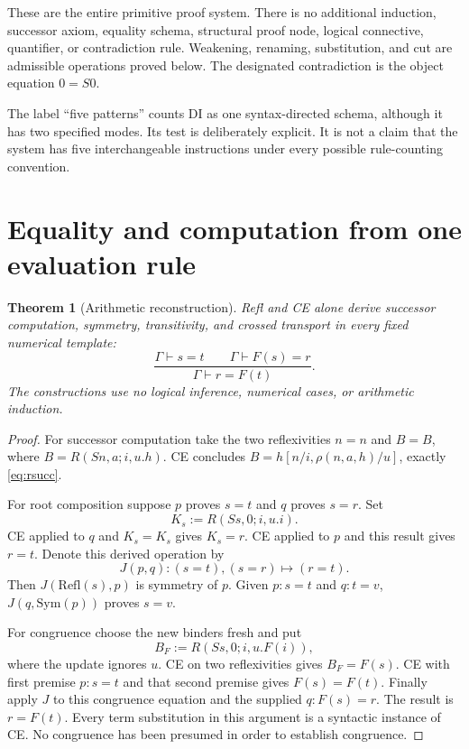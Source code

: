 \documentclass[11pt,letterpaper]{article}
\newtheorem{theorem}{Theorem}[section]
\theoremstyle{definition}
\begin{document}
These are the entire primitive proof system. There is no additional
induction, successor axiom, equality schema, structural proof node,
logical connective, quantifier, or contradiction rule. Weakening,
renaming, substitution, and cut are admissible operations proved below.
The designated contradiction is the object equation $0=S0$.

The label ``five patterns'' counts DI as one syntax-directed schema,
although it has two specified modes. Its test is deliberately explicit.
It is not a claim that the system has five interchangeable instructions
under every possible rule-counting convention.

\section{Equality and computation from one evaluation rule}
\label{sec:equality}

\begin{theorem}[Arithmetic reconstruction]\label{thm:arithmetic}
Refl and CE alone derive successor computation, symmetry, transitivity,
and crossed transport in every fixed numerical template:
\[
 \frac{\Gamma\vdash s=t\qquad\Gamma\vdash F(s)=r}
      {\Gamma\vdash r=F(t)}.
\]
The constructions use no logical inference, numerical cases, or
arithmetic induction.
\end{theorem}
\begin{proof}
For successor computation take the two reflexivities $n=n$ and
$B=B$, where $B=R(Sn,a;i,u.h)$. CE concludes
$B=h[n/i,\rho(n,a,h)/u]$, exactly \eqref{eq:rsucc}.

For root composition suppose $p$ proves $s=t$ and $q$ proves $s=r$.
Set
\[
                         K_s:=R(Ss,0;i,u.i).
\]
CE applied to $q$ and $K_s=K_s$ gives $K_s=r$. CE applied to $p$
and this result gives $r=t$. Denote this derived operation by
\[
                         J(p,q): (s=t),(s=r)\longmapsto(r=t).
\]
Then $J(\mathrm{Refl}(s),p)$ is symmetry of $p$. Given $p:s=t$ and
$q:t=v$, $J(q,\mathrm{Sym}(p))$ proves $s=v$.

For congruence choose the new binders fresh and put
\[
                   B_F:=R(Ss,0;i,u.F(i)),
\]
where the update ignores $u$. CE on two reflexivities gives
$B_F=F(s)$. CE with first premise $p:s=t$ and that second premise
gives $F(s)=F(t)$. Finally apply $J$ to this congruence equation
and the supplied $q:F(s)=r$. The result is $r=F(t)$.
Every term substitution in this argument is a syntactic instance of
CE. No congruence has been presumed in order to establish congruence.
\end{proof}
\end{document}
